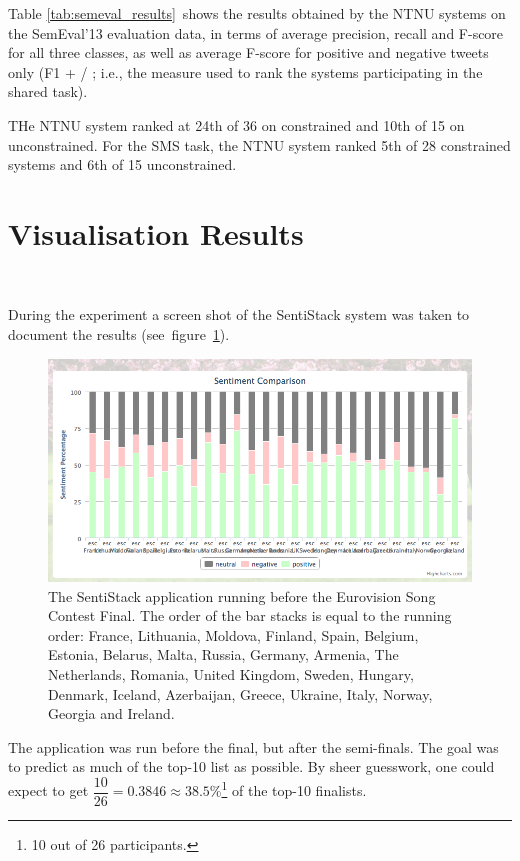 Table \ref{tab:semeval_results}~shows the results obtained by the NTNU systems on the SemEval'13 evaluation data, in terms of average precision, recall and F-score for all three classes, as well as average F-score for positive and negative tweets only (F1 + / \textendash; i.e., the measure used to rank the systems participating in the shared task).

THe NTNU system ranked at 24th of 36 on constrained and 10th of 15 on unconstrained. For the SMS task, the NTNU system ranked 5th of 28 constrained systems and 6th of 15 unconstrained.


\section{Visualisation Results}~\label{sec:esc_result}

During the experiment a screen shot of the SentiStack system was taken to document the results (see~figure~\ref{fig:sentistack_esc}).

\begin{figure}[htb!]
	\centering
	\includegraphics[width=\linewidth]{../img/sentistack_esc.png}
	\caption[SentiStack running before the Eurovision Song Contest Final]{The SentiStack application running before the Eurovision Song Contest Final. The order of the bar stacks is equal to the running order: France, Lithuania, Moldova, Finland, Spain, Belgium, Estonia, Belarus, Malta, Russia, Germany, Armenia, The Netherlands, Romania, United Kingdom, Sweden, Hungary, Denmark, Iceland, Azerbaijan, Greece, Ukraine, Italy, Norway, Georgia and Ireland.}
	\label{fig:sentistack_esc}
\end{figure}

The application was run before the final, but after the semi-finals. The goal was to predict as much of the top-10 list as possible. By sheer guesswork, one could expect to get $\dfrac{10}{26} = 0.3846 \approx 38.5\%$\footnote{10 out of 26 participants.} of the top-10 finalists. 

